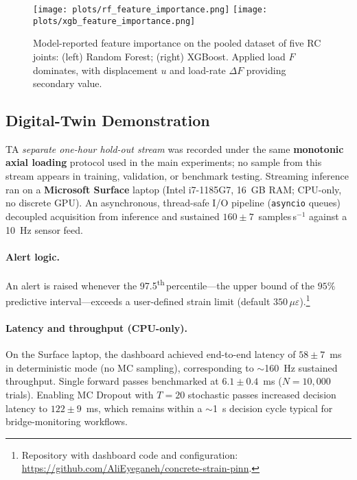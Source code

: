 \documentclass{article}
\begin{document}
\begin{figure}[H]
    \centering
    \texttt{[image: plots/rf\_feature\_importance.png]}
    \texttt{[image: plots/xgb\_feature\_importance.png]}
    \caption{Model-reported feature importance on the pooled dataset of five RC joints: (left) Random Forest; (right) XGBoost. Applied load $F$ dominates, with displacement $u$ and load-rate $\Delta F$ providing secondary value.}
    \label{fig:feature_importance}
\end{figure}


\subsection{Digital-Twin Demonstration}
\label{sec:dtdemo}

TA \emph{separate one-hour hold-out stream} was recorded under the same \textbf{monotonic axial loading} protocol used in the main experiments; no sample from this stream appears in training, validation, or benchmark testing. Streaming inference ran on a \textbf{Microsoft Surface} laptop (Intel i7-1185G7, 16~GB RAM; CPU-only, no discrete GPU). An asynchronous, thread-safe I/O pipeline (\texttt{asyncio} queues) decoupled acquisition from inference and sustained $160\pm7$~samples\,s$^{-1}$ against a 10~Hz sensor feed.

\paragraph{Alert logic.}
An alert is raised whenever the 97.5\textsuperscript{th}\,percentile---the upper bound of the $95\%$ predictive interval---exceeds a user-defined strain limit (default $350\,\mu\varepsilon$).\footnote{Repository with dashboard code and configuration: \url{https://github.com/AliEyeganeh/concrete-strain-pinn}.}

\paragraph{Latency and throughput (CPU-only).}
On the Surface laptop, the dashboard achieved end-to-end latency of $58\!\pm\!7$~ms in deterministic mode (no MC sampling), corresponding to $\sim$160~Hz sustained throughput. Single forward passes benchmarked at $6.1\!\pm\!0.4$~ms ($N{=}10{,}000$ trials). Enabling MC Dropout with $T{=}20$ stochastic passes increased decision latency to $122\!\pm\!9$~ms, which remains within a $\sim$1~s decision cycle typical for bridge-monitoring workflows.
\end{document}
